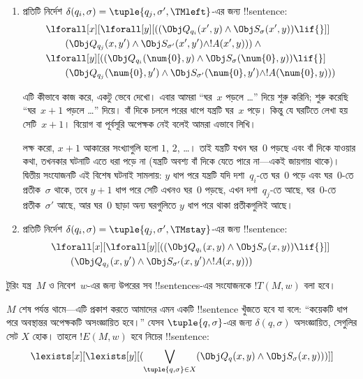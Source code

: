 \documentclass[../../../include/open-logic-section]{subfiles}
\begin{document}
\begin{enumerate}
\begin{enumerate}
\item {} প্রতিটি নির্দেশ
$\delta(q_i,\sigma)=\tuple{q_j,\sigma',\TMleft}$-এর জন্য !!{sentence}:
\begin{align*}
& \lforall[x][\lforall[y][
    ((\Obj Q_{q_i}(x', y) \land \Obj S_{\sigma}(x', y)) \lif {}]]\\
& \qquad   (\Obj Q_{q_j}(x, y') \land \Obj S_{\sigma'}(x', y') \land
!A(x', y))) \land {}\\
& \lforall[y][((\Obj Q_{q_i}(\num{0}, y) \land \Obj S_{\sigma}(\num{0},
    y)) \lif {}]\\
& \qquad (\Obj Q_{q_j}(\num{0}, y') \land \Obj S_{\sigma'}(\num{0},
  y') \land !A(\num{0}, y)))
\end{align*}

এটি কীভাবে কাজ করে, একটু ভেবে দেখো। এবার আমরা “ঘর~$x$ পড়লে \dots” দিয়ে
শুরু করিনি; শুরু করেছি “ঘর~$x+1$ পড়লে \dots” দিয়ে। বাঁ দিকে চললে পরের
ধাপে যন্ত্রটি ঘর~$x$ পড়ে। কিন্তু যে ঘরটিতে লেখা হয় সেটি~$x+1$। বিয়োগ বা
পূর্বসূরি অপেক্ষক নেই বলেই আমরা এভাবে লিখি।

লক্ষ করো, $x+1$ আকারের সংখ্যাগুলি হলো $1$, $2$, \dots। তাই যন্ত্রটি যখন
ঘর~$0$ পড়ছে এবং বাঁ দিকে যাওয়ার কথা, তখনকার ঘটনাটি এতে ধরা পড়ে না
(যন্ত্রটি অবশ্য বাঁ দিকে যেতে পারে না—একই জায়গায় থাকে)। দ্বিতীয় সংযোজনটি
এই বিশেষ ঘটনাই সামলায়: $y$ ধাপ পরে যন্ত্রটি যদি দশা~$q_i$-তে ঘর~$0$ পড়ে
এবং ঘর~$0$-তে প্রতীক~$\sigma$ থাকে, তবে $y+1$ ধাপ পরে সেটি এখনও ঘর~$0$
পড়ছে, এখন দশা~$q_j$-তে আছে, ঘর~$0$-তে প্রতীক~$\sigma'$ আছে, আর ঘর~$0$
ছাড়া অন্য ঘরগুলিতে $y$ ধাপ পরে থাকা প্রতীকগুলিই আছে।
\item {} প্রতিটি নির্দেশ
$\delta(q_i,\sigma)=\tuple{q_j,\sigma',\TMstay}$-এর জন্য !!{sentence}:
\begin{align*}
& \lforall[x][\lforall[y][(
   (\Obj Q_{q_i}(x, y) \land \Obj S_{\sigma}(x, y)) \lif {}]] \\
&\qquad   (\Obj Q_{q_j}(x, y') \land \Obj S_{\sigma'}(x, y') \land
!A(x, y)))
\end{align*}
\end{enumerate}
\end{enumerate}
টুরিং যন্ত্র~$M$ ও নিবেশ~$w$-এর জন্য উপরের সব !!{sentence}s-এর সংযোজনকে
$!T(M,w)$ বলা হবে।

$M$ শেষ পর্যন্ত থামে—এটি প্রকাশ করতে আমাদের এমন একটি !!{sentence} খুঁজতে হবে
যা বলে: “কয়েকটি ধাপ পরে অবস্থান্তর অপেক্ষকটি অসংজ্ঞায়িত হবে।” যেসব
$\tuple{q,\sigma}$-এর জন্য $\delta(q,\sigma)$ অসংজ্ঞায়িত, সেগুলির সেট
$X$ হোক। তাহলে $!E(M,w)$ হবে নিচের !!{sentence}:
\[
\lexists[x][\lexists[y][(\bigvee_{\tuple{q, \sigma} \in
      X}(\Obj Q_q(x, y) \land \Obj S_\sigma(x, y)))]]
\]
\end{document}
